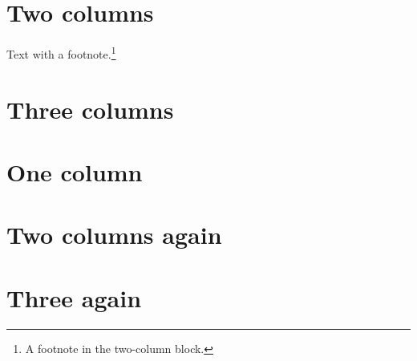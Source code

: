 \documentclass[twocolumn]{article}
\begin{document}
\section{Two columns}
\lipsum[1][1-12]
Text with a footnote.\footnote{A footnote in the two-column block.}
\lipsum[2][1-6]
\section{Three columns}
\lipsum[3-4]
\section{One column}
\lipsum[5][1-6]
\section{Two columns again}
\lipsum[6-12]
\section{Three again}
\lipsum[13-14]
\end{document}
